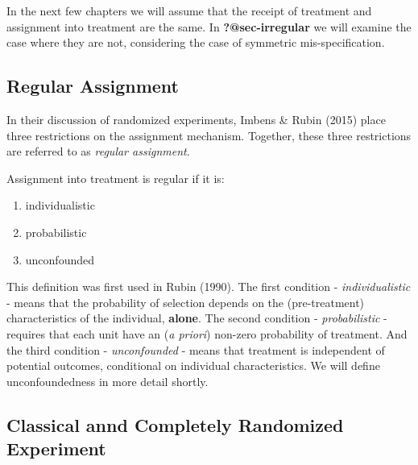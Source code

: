 \documentclass[
  letterpaper,
  DIV=11,
  numbers=noendperiod]{scrreprt}
\theoremstyle{definition}
\theoremstyle{remark}
\begin{document}
In the next few chapters we will assume that the receipt of treatment
and assignment into treatment are the same. In \textbf{?@sec-irregular}
we will examine the case where they are not, considering the case of
symmetric mis-specification.

\subsection{Regular Assignment}\label{regular-assignment}

In their discussion of randomized experiments, Imbens \& Rubin (2015)
place three restrictions on the assignment mechanism. Together, these
three restrictions are referred to as \emph{regular assignment}.

\begin{tcolorbox}[enhanced jigsaw, bottomrule=.15mm, coltitle=black, arc=.35mm, left=2mm, opacityback=0, leftrule=.75mm, colbacktitle=quarto-callout-note-color!10!white, title={Note}, toprule=.15mm, bottomtitle=1mm, breakable, colframe=quarto-callout-note-color-frame, opacitybacktitle=0.6, titlerule=0mm, colback=white, rightrule=.15mm, toptitle=1mm]

Assignment into treatment is regular if it is:

\begin{enumerate}
\def\labelenumi{\arabic{enumi}.}
\item
  individualistic
\item
  probabilistic
\item
  unconfounded
\end{enumerate}

\end{tcolorbox}

This definition was first used in Rubin (1990). The first condition -
\emph{individualistic} - means that the probability of selection depends
on the (pre-treatment) characteristics of the individual,
\textbf{alone}. The second condition - \emph{probabilistic} - requires
that each unit have an (\emph{a priori}) non-zero probability of
treatment. And the third condition - \emph{unconfounded} - means that
treatment is independent of potential outcomes, conditional on
individual characteristics. We will define unconfoundedness in more
detail shortly.

\subsection{Classical annd Completely Randomized
Experiment}\label{classical-annd-completely-randomized-experiment}
\end{document}
